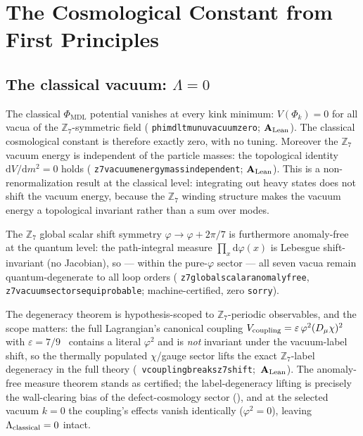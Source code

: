 \documentclass[11pt]{article}
\theoremstyle{remark}
\newcommand{\PHIMDL}{\Phi_{\mathrm{MDL}}}
\newcommand{\ZS}{\mathbb{Z}_7}
\newcommand{\lean}[1]{%
  \penalty-100
  \begingroup\def\_{\textunderscore\allowbreak}\texttt{#1}\endgroup}
\newcommand{\CatAL}{\ensuremath{\textbf{A}_{\rm Lean}}}
\begin{document}
\section{The Cosmological Constant from First Principles}
\label{sec:cc}

\subsection{The classical vacuum: $\Lambda = 0$}
\label{sec:cc-classical}

The classical $\PHIMDL$ potential vanishes at every kink minimum: $V(\Phi_k) = 0$
for all vacua of the $\ZS$-symmetric field (\lean{phimdl\_tmunu\_vacuum\_zero};
\CatAL). The classical cosmological constant is therefore exactly zero, with no
tuning. Moreover the $\ZS$ vacuum energy is independent of the particle masses: the
topological identity $\mathrm{d}V/\mathrm{d}m^2 = 0$ holds
(\lean{z7\_vacuum\_energy\_mass\_independent}; \CatAL). This is a non-renormalization
result at the classical level: integrating out heavy states does not shift the
vacuum energy, because the $\ZS$ winding structure makes the vacuum energy a
topological invariant rather than a sum over modes.

The $\ZS$ global scalar shift symmetry $\varphi\to\varphi+2\pi/7$ is furthermore
anomaly-free at the quantum level: the path-integral measure $\prod_x\mathrm{d}\varphi(x)$
is Lebesgue shift-invariant (no Jacobian), so --- within the pure-$\varphi$ sector ---
all seven vacua remain quantum-degenerate to all loop orders
(\lean{z7\_global\_scalar\_anomaly\_free},
\lean{z7\_vacuum\_sectors\_equiprobable}; machine-certified, zero \texttt{sorry}).

The degeneracy theorem is hypothesis-scoped to $\ZS$-periodic observables, and the
scope matters: the full Lagrangian's canonical coupling
$V_{\rm coupling} = \varepsilon\,\varphi^2 (D_\mu\chi)^2$ with
$\varepsilon = 7/9$~\cite{SpivackPhiMDLField} contains a literal $\varphi^2$ and is
\emph{not} invariant under the vacuum-label shift, so the thermally populated
$\chi$/gauge sector lifts the exact $\ZS$-label degeneracy in the full theory
\mbox{(\lean{vcoupling\_breaks\_z7\_shift}; \CatAL)}.
The anomaly-free measure theorem stands as certified; the label-degeneracy lifting
is precisely the wall-clearing bias of the defect-cosmology sector
(), and at the selected vacuum $k=0$ the coupling's effects
vanish identically ($\varphi^2 = 0$), leaving $\Lambda_{\rm classical} = 0$ intact.
\end{document}
